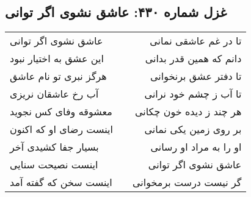 \begin{center}
\section*{غزل شماره ۴۳۰: عاشق نشوی اگر توانی}
\label{sec:430}
\begin{longtable}{l p{0.5cm} r}
عاشق نشوی اگر توانی
&&
تا در غم عاشقی نمانی
\\
این عشق به اختیار نبود
&&
دانم که همین قدر بدانی
\\
هرگز نبری تو نام عاشق
&&
تا دفتر عشق برنخوانی
\\
آب رخ عاشقان نریزی
&&
تا آب ز چشم خود نرانی
\\
معشوقه وفای کس نجوید
&&
هر چند ز دیده خون چکانی
\\
اینست رضای او که اکنون
&&
بر روی زمین یکی نمانی
\\
بسیار جفا کشیدی آخر
&&
او را به مراد او رسانی
\\
اینست نصیحت سنایی
&&
عاشق نشوی اگر توانی
\\
اینست سخن که گفته آمد
&&
گر نیست درست برمخوانی
\\
\end{longtable}
\end{center}
